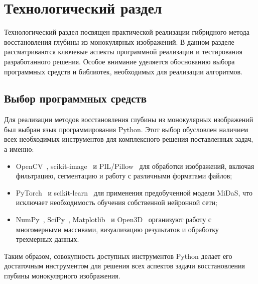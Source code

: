 \chapter{Технологический раздел}

Технологический раздел посвящен практической реализации гибридного метода восстановления глубины из монокулярных изображений.
В данном разделе рассматриваются ключевые аспекты программной реализации и тестирования разработанного решения.
Особое внимание уделяется обоснованию выбора программных средств и библиотек, необходимых для реализации алгоритмов.

\section{Выбор программных средств}

Для реализации методов восстановления глубины из монокулярных изображений был выбран язык программирования Python.
Этот выбор обусловлен наличием всех необходимых инструментов для комплексного решения поставленных задач, а именно:

\begin{itemize}
    \item OpenCV~\cite{opencv_library}, scikit-image~\cite{van2014scikit} и PIL/Pillow~\cite{clark2015pillow} для обработки изображений, включая фильтрацию, сегментацию и работу с различными форматами файлов;
    \item PyTorch~\cite{paszke2019pytorch} и scikit-learn~\cite{pedregosa2011scikit} для применения предобученной модели MiDaS, что исключает необходимость обучения собственной нейронной сети;
    \item NumPy~\cite{harris2020array}, SciPy~\cite{virtanen2020scipy}, Matplotlib~\cite{hunter2007matplotlib} и Open3D~\cite{zhou2018open3d} организуют работу с многомерными массивами, визуализацию результатов и обработку трехмерных данных.
\end{itemize}

Таким образом, совокупность доступных инструментов Python делает его достаточным инструментом для решения всех аспектов задачи восстановления глубины монокулярного изображения.
